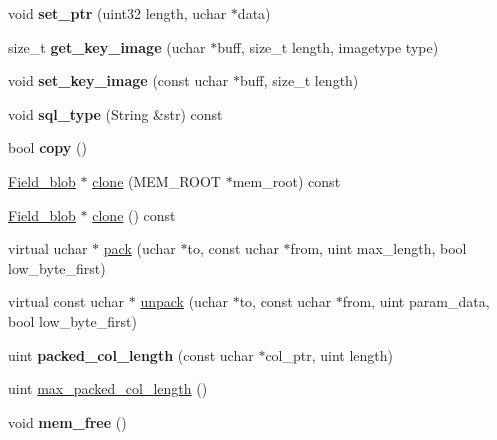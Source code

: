 \begin{DoxyCompactItemize}
void {\bfseries set\+\_\+ptr} (uint32 length, uchar $\ast$data)
\item 
\mbox{\label{classField__blob_a449aa185a7caf5b694d5b69745857e78}} 
size\+\_\+t {\bfseries get\+\_\+key\+\_\+image} (uchar $\ast$buff, size\+\_\+t length, imagetype type)
\item 
\mbox{\label{classField__blob_a38ba0c8cb25412f4d2ae69043f219d8c}} 
void {\bfseries set\+\_\+key\+\_\+image} (const uchar $\ast$buff, size\+\_\+t length)
\item 
\mbox{\label{classField__blob_a342aafbba130aeab2efa9f5278dfdc89}} 
void {\bfseries sql\+\_\+type} (String \&str) const
\item 
\mbox{\label{classField__blob_acda5fbcb0aaf629971dcee280872789e}} 
bool {\bfseries copy} ()
\item 
\mbox{\hyperlink{classField__blob}{Field\+\_\+blob}} $\ast$ \mbox{\hyperlink{classField__blob_adb81abc88601964eb822c176bd192c6a}{clone}} (M\+E\+M\+\_\+\+R\+O\+OT $\ast$mem\+\_\+root) const
\item 
\mbox{\hyperlink{classField__blob}{Field\+\_\+blob}} $\ast$ \mbox{\hyperlink{classField__blob_a075469b9df8583c1dc4968a983577886}{clone}} () const
\item 
virtual uchar $\ast$ \mbox{\hyperlink{classField__blob_ae15681deef846bd350bdb09b5132b120}{pack}} (uchar $\ast$to, const uchar $\ast$from, uint max\+\_\+length, bool low\+\_\+byte\+\_\+first)
\item 
virtual const uchar $\ast$ \mbox{\hyperlink{classField__blob_a1dc550d11713918f94f12abe0fd36caa}{unpack}} (uchar $\ast$to, const uchar $\ast$from, uint param\+\_\+data, bool low\+\_\+byte\+\_\+first)
\item 
\mbox{\label{classField__blob_a0aca148caf04d0a3138575de33a09faf}} 
uint {\bfseries packed\+\_\+col\+\_\+length} (const uchar $\ast$col\+\_\+ptr, uint length)
\item 
uint \mbox{\hyperlink{classField__blob_ad9fa84e8473ea63cbdd413c99dd9dbb4}{max\+\_\+packed\+\_\+col\+\_\+length}} ()
\item 
\mbox{\label{classField__blob_a5d245f590b77f165a734bafa172ed559}} 
void {\bfseries mem\+\_\+free} ()
\item 

\end{DoxyCompactItemize}
